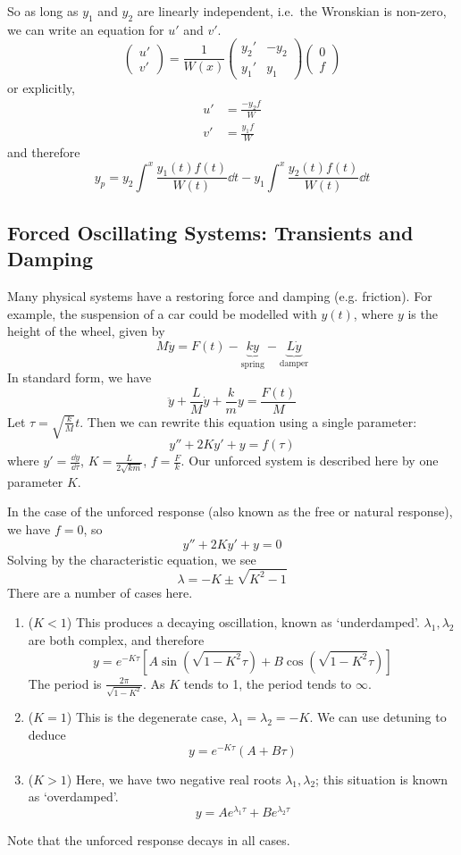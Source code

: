 So as long as \(y_1\) and \(y_2\) are linearly independent, i.e.\ the Wronskian is non-zero, we can write an equation for \(u'\) and \(v'\).
\[
	\begin{pmatrix}
		u' \\ v'
	\end{pmatrix} = \frac{1}{W(x)}\begin{pmatrix}
		y_2' & -y_2 \\ y_1' & y_1
	\end{pmatrix} \begin{pmatrix}
		0 \\ f
	\end{pmatrix}
\]
or explicitly,
\begin{align*}
	u' & = \frac{-y_2 f}{W} \\
	v' & = \frac{y_1 f}{W}
\end{align*}
and therefore
\[ y_p = y_2 \int^x \frac{y_1(t) f(t)}{W(t)}\dd{t} - y_1 \int^x \frac{y_2(t) f(t)}{W(t)}\dd{t} \]

\subsection{Forced Oscillating Systems: Transients and Damping}
Many physical systems have a restoring force and damping (e.g. friction). For example, the suspension of a car could be modelled with \(y(t)\), where \(y\) is the height of the wheel, given by
\[ M\ddot y = F(t) - \underbrace{ky}_{\text{spring}} - \underbrace{L\dot y}_{\text{damper}} \]
In standard form, we have
\[ \ddot y + \frac{L}{M} \dot y + \frac{k}{m} y = \frac{F(t)}{M} \]
Let \(\tau = \sqrt{\frac{k}{M}} t\). Then we can rewrite this equation using a single parameter:
\[ y'' + 2Ky' + y = f(\tau) \]
where \(y' = \frac{\dd{y}}{\dd \tau}\), \(K = \frac{L}{2\sqrt{km}}\), \(f = \frac{F}{k}\).
Our unforced system is described here by one parameter \(K\).

In the case of the unforced response (also known as the free or natural response), we have \(f=0\), so
\[ y'' + 2Ky' + y = 0 \]
Solving by the characteristic equation, we see
\[ \lambda = -K \pm \sqrt{K^2 - 1} \]
There are a number of cases here.
\begin{enumerate}
	\item (\(K < 1\)) This produces a decaying oscillation, known as `underdamped'. \(\lambda_1, \lambda_2\) are both complex, and therefore
	      \[ y = e^{-K\tau}\left[A\sin(\sqrt{1-K^2}\tau) + B\cos(\sqrt{1-K^2}\tau)\right] \]
	      The period is \(\frac{2\pi}{\sqrt{1-K^2}}\). As \(K\) tends to 1, the period tends to \(\infty\).
	\item (\(K = 1\)) This is the degenerate case, \(\lambda_1 = \lambda_2 = -K\). We can use detuning to deduce
	      \[ y = e^{-K\tau} (A + B\tau) \]
	\item (\(K > 1\)) Here, we have two negative real roots \(\lambda_1, \lambda_2\); this situation is known as `overdamped'.
	      \[ y = Ae^{\lambda_1 \tau} + Be^{\lambda_2 \tau} \]
\end{enumerate}
Note that the unforced response decays in all cases.
